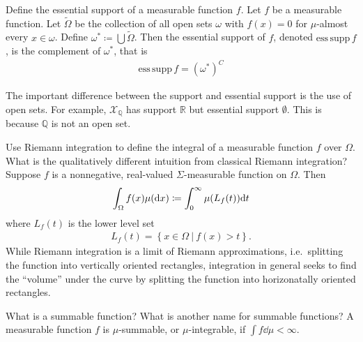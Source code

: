 \documentclass[avery5388,grid,frame]{flashcards}
\newcommand{\esssupp}{\mathrm{ess}\,\mathrm{supp}\,}
\def\Rl{\mathbb{R}}
\begin{document}
\begin{flashcard}
    {Define the essential support of a measurable function $f$.}
    Let $f$ be a measurable function.  Let $\tilde{\Omega}$ be the collection of all open sets $\omega$ with $f(x) = 0$ for $\mu$-almost every $x \in \omega$.  Define $\omega^* \coloneqq \bigcup\tilde{\Omega}$.  Then the essential support of $f$, denoted $\esssupp f$, is the complement of $\omega^*$, that is
    \begin{align*}
        \esssupp f = (\omega^*)^C
    \end{align*}

    The important difference between the support and essential support is the use of open sets.  For example, $\mathcal{X}_\mathbb{Q}$ has support $\Rl$ but essential support $\emptyset$.  This is because $\mathbb{Q}$ is not an open set.
\end{flashcard}

\begin{flashcard}
    {Use Riemann integration to define the integral of a measurable function $f$ over $\Omega$.  What is the qualitatively different intuition from classical Riemann integration?}
    Suppose $f$ is a nonnegative, real-valued $\Sigma$-measurable function on $\Omega$.  Then
    \begin{align*}
        \int_\Omega f(x) \mu(\dd x) \coloneqq \int_0^\infty \mu\qty(L_f(t)) \dd t
    \end{align*}
    where $L_f(t)$ is the lower level set
    \begin{align*}
        L_f(t) = \left\{x \in \Omega\ |\ f(x) > t\right\}.
    \end{align*}
    While Riemann integration is a limit of Riemann approximations, i.e.~splitting the function into vertically oriented rectangles, integration in general seeks to find the ``volume'' under the curve by splitting the function into horizonatally oriented rectangles.
\end{flashcard}

\begin{flashcard}
    {What is a summable function?  What is another name for summable functions?}
    A measurable function $f$ is $\mu$-summable, or $\mu$-integrable, if $\int f \dd\mu < \infty$.
\end{flashcard}
\end{document}
